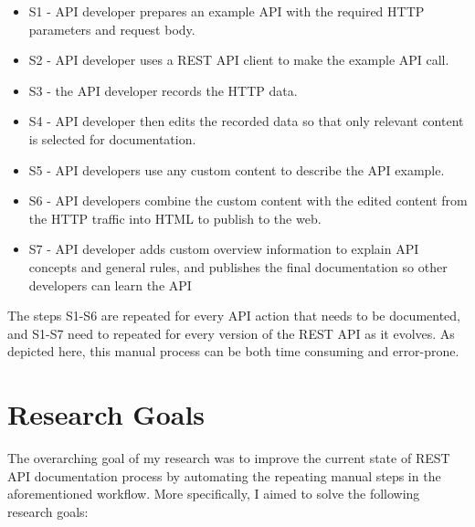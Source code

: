 \begin{itemize}
  \item S1 - API developer prepares an example API with the required HTTP parameters and request body.
  \item S2 - API developer uses a REST API client to make the example API call.
  \item S3 - the API developer records the HTTP data.
  \item S4 - API developer then edits the recorded data so that only relevant content is selected for documentation.
  \item S5 - API developers use any custom content to describe the API example.
  \item S6 - API developers combine the custom content with the edited content from the HTTP traffic into HTML to publish to the web.
  \item S7 - API developer adds custom overview information to explain API concepts and general rules, and publishes the final documentation so other developers can learn the API
\end{itemize}

The steps S1-S6 are repeated for every API action that needs to be documented, and S1-S7 need to repeated for every version of the REST API as it evolves. As depicted here, this manual process can be both time consuming and error-prone.

\section{Research Goals}
The overarching goal of my research was to improve the current state of REST API documentation process by automating the repeating manual steps in the aforementioned workflow. More specifically, I aimed to solve the following research goals:

